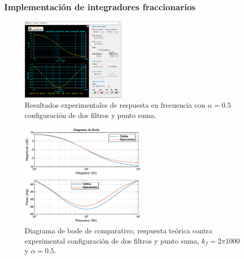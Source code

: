 \documentclass[10pt]{beamer}
\begin{document}
	\begin{frame}
		\frametitle{Implementación de integradores fraccionarios}
		\begin{minipage}[t]{0.45\textwidth}
			\begin{figure}[!ht] 
		\caption{Resultados experimentales de respuesta en frecuencia con $\alpha = 0.5$ configuración de dos filtros y punto suma.}
		\label{fig:M2_05}
		\centering
		\includegraphics[width = 5cm]{../imagenes/M2_05.png}
	\end{figure}	
		\end{minipage} \hfill \begin{minipage}[t]{0.45\textwidth}
			\begin{figure}[!ht]
		\caption{Diagrama de bode de comparativo, respuesta teórica contra experimental configuración de dos filtros y punto suma,  $k_{f} = 2\pi 1000$ y  $\alpha = 0.5$.} 
		\label{fig:V15_bodes_comparativos_suma}
		\centering
		\includegraphics[width=6cm]{../imagenes/V15_bodes_comparativos_suma.eps}
	\end{figure}
		\end{minipage}
	\end{frame}
\end{document}
